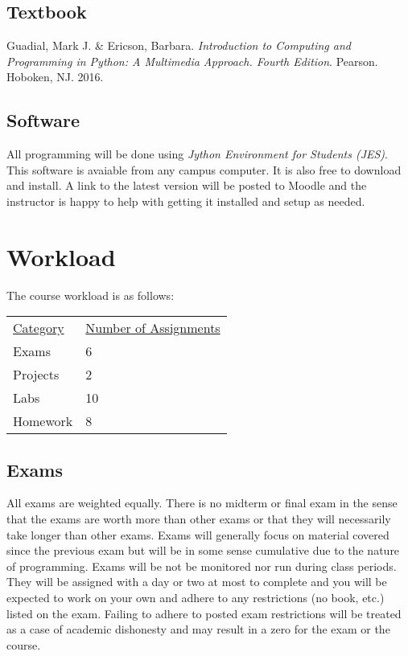 \documentclass[10pt]{article}
\begin{document}
\subsection{Textbook}

\noindent
Guadial, Mark J. \& Ericson, Barbara. \textit{Introduction to Computing and Programming in Python: A Multimedia Approach. Fourth Edition}. Pearson. Hoboken, NJ. 2016. %

\subsection{Software}

All programming will be done using \textit{Jython Environment for Students (JES)}. This software is avaiable from any campus computer. It is also free to download and install. A link to the latest version will be posted to Moodle and the instructor is happy to help with getting it installed and setup as needed.

\section{Workload}

The course workload is as follows:
\begin{center}
  \begin{tabular}{ll}
    \underline{Category} & \underline{Number of Assignments} \\
    Exams & 6 \\
    Projects & 2 \\
    Labs & 10 \\
    Homework & 8
  \end{tabular}
\end{center}


\subsection*{Exams}

All exams are weighted equally. There is no midterm or final exam in the sense that the exams are worth more than other exams or that they will necessarily take longer than other exams.  Exams will generally focus on material covered since the previous exam but will be in some sense cumulative due to the nature of programming. Exams will be not be monitored nor run during class periods. They will be assigned with a day or two at most to complete and you will be expected to work on your own and adhere to any restrictions (no book, etc.) listed on the exam. Failing to adhere to posted exam restrictions will be treated as a case of academic dishonesty and may result in a zero for the exam or the course.
\end{document}
